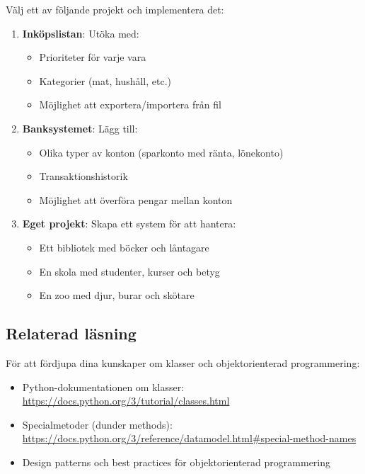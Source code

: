 \begin{exercise}[Vidareutveckling]
  Välj ett av följande projekt och implementera det:
  \begin{enumerate}
    \item \textbf{Inköpslistan}: Utöka med:
      \begin{itemize}
        \item Prioriteter för varje vara
        \item Kategorier (mat, hushåll, etc.)
        \item Möjlighet att exportera/importera från fil
      \end{itemize}
    
    \item \textbf{Banksystemet}: Lägg till:
      \begin{itemize}
        \item Olika typer av konton (sparkonto med ränta, lönekonto)
        \item Transaktionshistorik
        \item Möjlighet att överföra pengar mellan konton
      \end{itemize}
    
    \item \textbf{Eget projekt}: Skapa ett system för att hantera:
      \begin{itemize}
        \item Ett bibliotek med böcker och låntagare
        \item En skola med studenter, kurser och betyg
        \item En zoo med djur, burar och skötare
      \end{itemize}
  \end{enumerate}
\end{exercise}

\subsection{Relaterad läsning}

För att fördjupa dina kunskaper om klasser och objektorienterad programmering:

\begin{itemize}
  \item Python-dokumentationen om klasser: \\
    \url{https://docs.python.org/3/tutorial/classes.html}
  
  \item Specialmetoder (dunder methods): \\
    \url{https://docs.python.org/3/reference/datamodel.html#special-method-names}
  
  \item Design patterns och best practices för objektorienterad programmering
\end{itemize}

